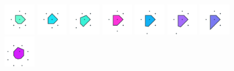 \documentclass[text.tex]{subfiles}
\begin{document}
\begin{figure}[h!]
\includegraphics[width=0.12\textwidth]{img/results/octagon/octagon_131066_(-2_3alpha_4)_005.pdf}
\includegraphics[width=0.12\textwidth]{img/results/octagon/octagon_131066_(-2_3alpha_4)_006.pdf}
\includegraphics[width=0.12\textwidth]{img/results/octagon/octagon_131066_(-2_3alpha_4)_007.pdf}
\includegraphics[width=0.12\textwidth]{img/results/octagon/octagon_131066_(-2_3alpha_4)_008.pdf}
\includegraphics[width=0.12\textwidth]{img/results/octagon/octagon_131066_(-2_3alpha_4)_009.pdf}
\includegraphics[width=0.12\textwidth]{img/results/octagon/octagon_131066_(-2_3alpha_4)_010.pdf}
\includegraphics[width=0.12\textwidth]{img/results/octagon/octagon_131066_(-2_3alpha_4)_011.pdf}
\includegraphics[width=0.12\textwidth]{img/results/octagon/octagon_131066_(-2_3alpha_4)_012.pdf}
\end{figure}
\end{document}
